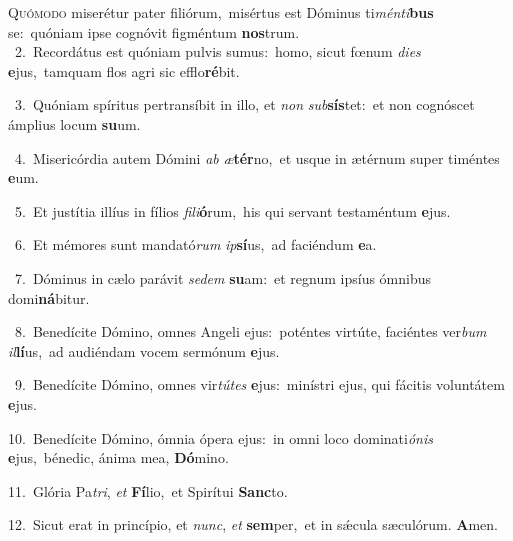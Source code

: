\lettrine{\initial\textcolor{\initialcolor}{Q}}{uómodo} miserétur pater filiórum,~\dagger misértus est Dóminus ti\-\textit{mén}\-\textit{ti}\textbf{bus} se:~\star quóniam ipse cognóvit figméntum \textbf{nos}\-trum.\\
{\numbfont\textcolor{\numbcolor}{~2.}}~Recordátus est quóniam pulvis sumus:~\dagger homo, sicut fœnum \textit{di}\-\textit{es} \textbf{e}\-jus,~\star tamquam flos agri sic efflo\-\textbf{ré}\-bit.\par
{\numbfont\textcolor{\numbcolor}{~3.}}~Quóniam spíritus pertransíbit in illo, et \textit{non} \textit{sub}\-\textbf{sís}tet:~\star et non cognóscet ámplius locum \textbf{su}\-um.\par
{\numbfont\textcolor{\numbcolor}{~4.}}~Misericórdia autem Dómini \textit{ab} \textit{æ}\-\textbf{tér}no,~\star et usque in ætérnum super timéntes \textbf{e}\-um.\par
{\numbfont\textcolor{\numbcolor}{~5.}}~Et justítia illíus in fílios \textit{fi}\-\textit{li}\textbf{ó}rum,~\star his qui servant testaméntum \textbf{e}\-jus.\par
{\numbfont\textcolor{\numbcolor}{~6.}}~Et mémores sunt mandató\textit{rum} \textit{ip}\-\textbf{sí}us,~\star ad faciéndum \textbf{e}\-a.\par
{\numbfont\textcolor{\numbcolor}{~7.}}~Dóminus in cælo parávit \textit{se}\-\textit{dem} \textbf{su}\-am:~\star et regnum ipsíus ómnibus domi\-\textbf{ná}\-bitur.\par
{\numbfont\textcolor{\numbcolor}{~8.}}~Benedícite Dómino, omnes Angeli ejus:~\dagger poténtes virtúte, faciéntes ver\textit{bum} \textit{il}\-\textbf{lí}us,~\star ad audiéndam vocem sermónum \textbf{e}\-jus.\par
{\numbfont\textcolor{\numbcolor}{~9.}}~Benedícite Dómino, omnes vir\-\textit{tú}\-\textit{tes} \textbf{e}\-jus:~\star minístri ejus, qui fácitis voluntátem \textbf{e}\-jus.\par
{\numbfont\textcolor{\numbcolor}{10.}}~Benedícite Dómino, ómnia ópera ejus:~\dagger in omni loco dominati\-\textit{ó}\-\textit{nis} \textbf{e}\-jus,~\star bénedic, ánima mea, \textbf{Dó}\-mino.\par
{\numbfont\textcolor{\numbcolor}{11.}}~Glória Pa\-\textit{tri}\-, \textit{et} \textbf{Fí}\-lio,~\star et Spirítui \textbf{Sanc}\-to.\par
{\numbfont\textcolor{\numbcolor}{12.}}~Sicut erat in princípio, et \textit{nunc}\-, \textit{et} \textbf{sem}\-per,~\star et in sǽcula sæculórum. \textbf{A}\-men.\par
